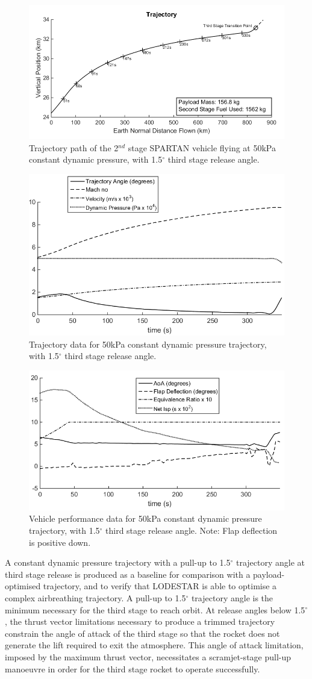 \documentclass[journal]{new-aiaa}
\begin{document}
\begin{figure}[H]
	\centering
	\includegraphics[width=.7\linewidth]{Constq}
	\caption{Trajectory path of the 2$^{nd}$ stage SPARTAN vehicle flying at 50kPa constant dynamic pressure, with 1.5$^\circ$ third stage release angle.}
	\label{fig:constq}
\end{figure}
\begin{figure}[ht]
	\centering	
	\includegraphics[width=.6\linewidth]{Constq-Aero}
	\caption{Trajectory data for 50kPa constant dynamic pressure trajectory, with 1.5$^\circ$ third stage release angle.}
	\label{fig:constq aero}
\end{figure}
\begin{figure}[ht]
	\centering
	\includegraphics[width=.6\linewidth]{Constq-Vehicle}
	\caption{Vehicle performance data for 50kPa constant dynamic pressure trajectory, with 1.5$^\circ$ third stage release angle. Note: Flap deflection is positive down.}
	\label{fig:constq vehicle}
\end{figure}


A constant dynamic pressure trajectory with a pull-up to 1.5$^\circ$ trajectory angle at third stage release is produced as a baseline for comparison with a payload-optimised trajectory, and to verify that LODESTAR is able to optimise a complex airbreathing trajectory. A pull-up to 1.5$^\circ$ trajectory angle is the minimum necessary for the third stage to reach orbit. At release angles below 1.5$^\circ$, the thrust vector limitations necessary to produce a trimmed trajectory constrain the angle of attack of the third stage so that the rocket does not generate the lift required to exit the atmosphere. This angle of attack limitation, imposed by the maximum thrust vector, necessitates a scramjet-stage pull-up manoeuvre in order for the third stage rocket to operate successfully. 
\end{document}
